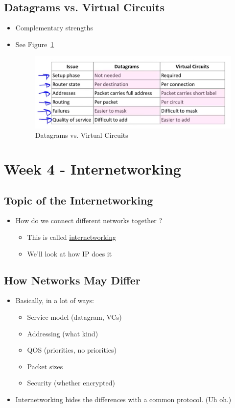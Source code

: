 \documentclass[12pt]{ctexart}   %
\begin{document}
	\subsection{Datagrams vs. Virtual Circuits}
	\begin{itemize}
		\item Complementary strengths
		\item See Figure~\ref{fig:4-2-9}
		
		\begin{figure}[h!] %
		\centering
		 \includegraphics[scale=0.7]{images/4-2-9}
		\caption{ Datagrams vs. Virtual Circuits }
		 \label{fig:4-2-9}
		 \end{figure}
	\end{itemize}
	
\section{Week 4 - Internetworking}
	\subsection{Topic of the Internetworking}
	\begin{itemize}
		\item How do we connect different networks together ?
		\begin{itemize}
			\item This is called \underline{internetworking}
			\item We'll look at how IP does it
		\end{itemize}
	\end{itemize}
	
	\subsection{How Networks May Differ}
	\begin{itemize}
		\item Basically, in a lot of ways:
		\begin{itemize}
			\item Service model (datagram, VCs)
			\item Addressing (what kind)
			\item QOS (priorities, no priorities)
			\item Packet sizes
			\item Security (whether encrypted)
		\end{itemize}
		
		\item Internetworking hides the differences with a common protocol. (Uh oh.)
	\end{itemize}
	
\end{document}
